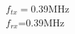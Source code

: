 \documentclass[preview]{standalone}
\begin{document}
\begin{center}
$f_{tx}=$0.39MHz\\$f_{rx}$=0.39MHz
\end{center}
\end{document}
